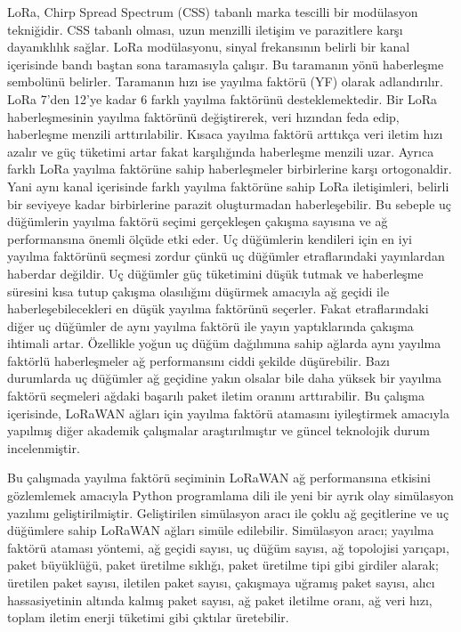 LoRa, Chirp Spread Spectrum (CSS) tabanlı marka tescilli bir modülasyon tekniğidir. CSS tabanlı olması, uzun menzilli iletişim ve parazitlere karşı dayanıklılık sağlar. LoRa modülasyonu, sinyal frekansının belirli bir kanal içerisinde bandı baştan sona taramasıyla çalışır. Bu taramanın yönü haberleşme sembolünü belirler. Taramanın hızı ise yayılma faktörü (YF) olarak adlandırılır. LoRa 7'den 12'ye kadar 6 farklı yayılma faktörünü desteklemektedir. Bir LoRa haberleşmesinin yayılma faktörünü değiştirerek, veri hızından feda edip, haberleşme menzili arttırılabilir. Kısaca yayılma faktörü arttıkça veri iletim hızı azalır ve güç tüketimi artar fakat karşılığında haberleşme menzili uzar. Ayrıca farklı LoRa yayılma faktörüne sahip haberleşmeler birbirlerine karşı ortogonaldir. Yani aynı kanal içerisinde farklı yayılma faktörüne sahip LoRa iletişimleri, belirli bir seviyeye kadar birbirlerine parazit oluşturmadan haberleşebilir. Bu sebeple uç düğümlerin yayılma faktörü seçimi gerçekleşen çakışma sayısına ve ağ performansına önemli ölçüde etki eder. Uç düğümlerin kendileri için en iyi yayılma faktörünü seçmesi zordur çünkü uç düğümler etraflarındaki yayınlardan haberdar değildir. Uç düğümler güç tüketimini düşük tutmak ve haberleşme süresini kısa tutup çakışma olasılığını düşürmek amacıyla ağ geçidi ile haberleşebilecekleri en düşük yayılma faktörünü seçerler. Fakat etraflarındaki diğer uç düğümler de aynı yayılma faktörü ile yayın yaptıklarında çakışma ihtimali artar. Özellikle yoğun uç düğüm dağılımına sahip ağlarda aynı yayılma faktörlü haberleşmeler ağ performansını ciddi şekilde düşürebilir. Bazı durumlarda uç düğümler ağ geçidine yakın olsalar bile daha yüksek bir yayılma faktörü seçmeleri ağdaki başarılı paket iletim oranını arttırabilir. Bu çalışma içerisinde, LoRaWAN ağları için yayılma faktörü atamasını iyileştirmek amacıyla yapılmış diğer akademik çalışmalar araştırılmıştır ve güncel teknolojik durum incelenmiştir.

Bu çalışmada yayılma faktörü seçiminin LoRaWAN ağ performansına etkisini gözlemlemek amacıyla Python programlama dili ile yeni bir ayrık olay simülasyon yazılımı geliştirilmiştir. Geliştirilen simülasyon aracı ile çoklu ağ geçitlerine ve uç düğümlere sahip LoRaWAN ağları simüle edilebilir. Simülasyon aracı; yayılma faktörü ataması yöntemi, ağ geçidi sayısı, uç düğüm sayısı, ağ topolojisi yarıçapı, paket büyüklüğü, paket üretilme sıklığı, paket üretilme tipi gibi girdiler alarak; üretilen paket sayısı, iletilen paket sayısı, çakışmaya uğramış paket sayısı, alıcı hassasiyetinin altında kalmış paket sayısı, ağ paket iletilme oranı, ağ veri hızı, toplam iletim enerji tüketimi gibi çıktılar üretebilir.

